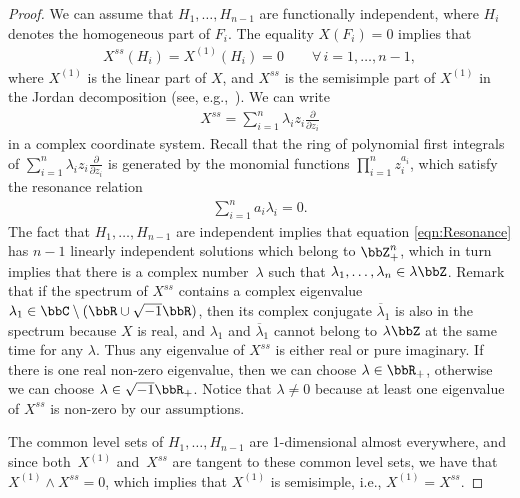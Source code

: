 \begin{proof} We can assume that $H_1,\dots,H_{n-1}$ are functionally independent, where $H_i$ denotes the homogeneous part
of $F_i$. The equality $X(F_i) = 0$ implies that
\begin{gather*}
 X^{ss}(H_i) = X^{(1)}(H_i) = 0 \qquad \forall \, i=1,\dots,n-1,
\end{gather*}
where $X^{(1)}$ is the linear part of $X$, and $X^{ss}$ is the semisimple part of $X^{(1)}$ in the Jordan decomposition
(see, e.g.,~\cite{Zung-Poincare2002,Zung-Nondegenerate2015}). We can write
\begin{gather*}
 X^{ss} = \sum_{i=1}^n \lambda_i z_i \frac{\partial}{\partial z_i}
\end{gather*}
in a complex coordinate system. Recall that the ring of polynomial f\/irst integrals of $\sum\limits_{i=1}^n \lambda_i z_i \frac{\partial}{\partial z_i}$ is generated by the monomial functions $\prod\limits_{i=1}^n z_i^{a_i}$, which satisfy the resonance relation
\begin{gather} \label{eqn:Resonance}
 \sum_{i=1}^n a_i \lambda_i = 0.
\end{gather}
The fact that $H_1,\dots, H_{n-1}$ are independent implies that equation \eqref{eqn:Resonance} has $n-1$ linearly
independent solutions which belong to $\bbZ^n_+$, which in turn implies that there is a complex number~$\lambda$ such that $\lambda_1,\dots, \lambda_n \in \lambda \bbZ$. Remark that if the spectrum of $X^{ss}$ contains
a complex eigenvalue $\lambda_1 \in \bbC \setminus (\bbR \cup \sqrt{-1}\bbR)$, then its complex conjugate $\overline \lambda_1$
is also in the spectrum because $X$ is real, and $\lambda_1$ and $\overline \lambda_1$ cannot belong to $\lambda\bbZ$
at the same time for any $\lambda$. Thus any eigenvalue of $X^{ss}$ is either real or pure imaginary. If there is one real
non-zero eigenvalue, then we can choose $\lambda \in \bbR_+$, otherwise we can choose $\lambda \in \sqrt{-1}\bbR_+$.
Notice that $\lambda \neq 0$ because at least one eigenvalue of $X^{ss}$ is non-zero by our assumptions.

The common level sets of $H_1, \dots, H_{n-1}$ are 1-dimensional almost everywhere, and since both~$X^{(1)}$
and~$X^{ss}$ are tangent to these common level sets, we have that $X^{(1)} \wedge X^{ss} = 0$, which implies that
$X^{(1)}$ is semisimple, i.e., $X^{(1)} = X^{ss}$.
\end{proof}

